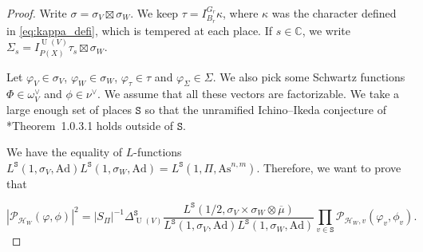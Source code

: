 \documentclass[letterpaper,11pt]{amsart}
\newcommand{\C}{\mathbb{C}}
\newcommand{\cH}{\mathcal{H}}
\newcommand{\cP}{\mathcal{P}}
\newcommand{\tS}{\mathtt{S}}
\newcommand{\<}{\negthickspace}
\DeclareMathOperator{\U}{U}
\theoremstyle{definition}
\theoremstyle{plain}
\theoremstyle{remark}
\numberwithin{equation}{section}
\begin{document}
\begin{proof}
    

Write $\sigma=\sigma_V \boxtimes \sigma_W$. We keep $\tau=I_{B_r}^{G_r} \kappa$, where $\kappa$ was the character defined in \eqref{eq:kappa_defi}, which is tempered at each place. If $s \in \C$, we write $\Sigma_s=I_{P(X)}^{\U(V)} \tau_s \boxtimes \sigma_W$. 

Let $\varphi_V \in \sigma_V$, $\varphi_W \in \sigma_W$, $\varphi_\tau \in \tau$ and $\varphi_\Sigma \in \Sigma$. We also pick some Schwartz functions $\Phi \in \omega^\vee_{V}$  and $\phi \in \nu^\vee$. We assume that all these vectors are factorizable. We take a large enough set of places $\tS$ so that the unramified Ichino--Ikeda conjecture of \cite{Boi}*{Theorem~1.0.3.1} holds outside of $\tS$. 

We have the equality of $L$-functions $ L^{\tS}(1,\sigma_V,\mathrm{Ad})L^{\tS}(1,\sigma_W,\mathrm{Ad})=L^{\tS}(1,\Pi,\mathrm{As}^{n,m})$. Therefore, we want to prove that

\begin{equation}
    \label{eq:IY_facto_proof}
        |\cP_{\cH_W}(\varphi,\phi)|^2=|S_\Pi|^{-1} \Delta_{\U(V)}^{\tS}\frac{L^{\tS}(1/2,\sigma_V \times \sigma_W \otimes \overline{\mu})}{ L^{\tS}(1,\sigma_V,\mathrm{Ad})L^{\tS}(1,\sigma_W,\mathrm{Ad})} \prod_{v \in \tS} \cP_{\cH_W,v}(\varphi_v,\phi_v).
    \end{equation}


\end{proof}
\end{document}
